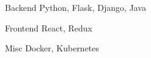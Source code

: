 

\begin{cvskills}

  \cvskill
    {Backend} %
    {Python, Flask, Django, Java} %

  \cvskill
    {Frontend} %
    {React, Redux} %

  \cvskill
    {Misc} %
    {Docker, Kubernetes} %

\end{cvskills}
